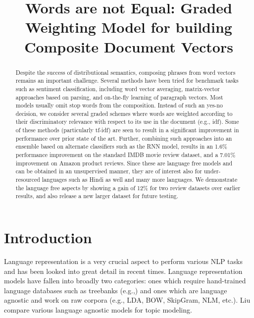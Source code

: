 \documentclass[11pt,a4paper]{article}
\title{Words are not Equal: Graded Weighting Model for building Composite Document Vectors}
\date{}
\begin{document}
\maketitle
\begin{abstract}
Despite the success of distributional semantics, composing phrases from word vectors remains an important challenge.  Several methods have been tried for benchmark tasks such as sentiment classification, including word vector averaging, matrix-vector approaches based on parsing, and on-the-fly learning of paragraph vectors. Most models usually omit stop words from the composition.  Instead of such an yes-no decision, we consider several graded schemes where words are weighted according to their discriminatory relevance with respect to its use in the document (e.g., idf). Some of these methods (particularly tf-idf) are seen to result in a significant improvement in performance over prior state of the art.  Further, combining such approaches into an ensemble based on alternate classifiers such as the RNN model, results in an 1.6\% performance improvement on the standard IMDB movie review dataset, and a 7.01\% improvement on Amazon product reviews. Since these are language free models and can be obtained in an unsupervised manner, they are of interest also for under-resourced languages such as Hindi as well and many more languages.  We demonstrate the language free aspects by showing a gain of 12\% for two review datasets over earlier results, and also release a new larger dataset for future testing.
\end{abstract}

\section{Introduction}
Language representation is a very crucial aspect to perform various NLP tasks and has been looked into great detail in recent times. Language representation models have fallen into broadly two categories: ones which require hand-trained language databases such as treebanks (e.g.,\cite{Socher:13}) and ones which are language agnostic and work on raw corpora (e.g., LDA, BOW, SkipGram, NLM, etc.). Liu  compare various language agnostic models for topic modeling.
\end{document}
